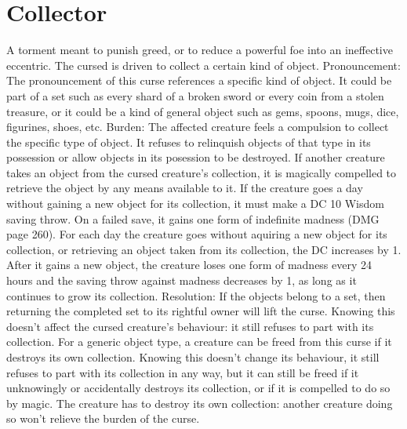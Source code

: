 \documentclass[10pt,a4paper,twoside,twocolumn,openany,bg=print,nodeprecatedcode]{dndbook}
\begin{document}
\section{Collector}
A torment meant to punish greed, or to reduce a powerful foe into an ineffective eccentric. The cursed is driven to collect a certain kind of object.
Pronouncement: The pronouncement of this curse references a specific kind of object. It could be part of a set such as every shard of a broken sword or every coin from a stolen treasure, or it could be a kind of general object such as gems, spoons, mugs, dice, figurines, shoes, etc.
Burden: The affected creature feels a compulsion to collect the specific type of object. It refuses to relinquish objects of that type in its possession or allow objects in its posession to be destroyed. If another creature takes an object from the cursed creature's collection, it is magically compelled to retrieve the object by any means available to it. If the creature goes a day without gaining a new object for its collection, it must make a DC 10 Wisdom saving throw. On a failed save, it gains one form of indefinite madness (DMG page 260). For each day the creature goes without aquiring a new object for its collection, or retrieving an object taken from its collection, the DC increases by 1. After it gains a new object, the creature loses one form of madness every 24 hours and the saving throw against madness decreases by 1, as long as it continues to grow its collection.
Resolution: If the objects belong to a set, then returning the completed set to its rightful owner will lift the curse. Knowing this doesn't affect the cursed creature's behaviour: it still refuses to part with its collection.
For a generic object type, a creature can be freed from this curse if it destroys its own collection. Knowing this doesn't change its behaviour, it still refuses to part with its collection in any way, but it can still be freed if it unknowingly or accidentally destroys its collection, or if it is compelled to do so by magic. The creature has to destroy its own collection: another creature doing so won't relieve the burden of the curse.
\end{document}
